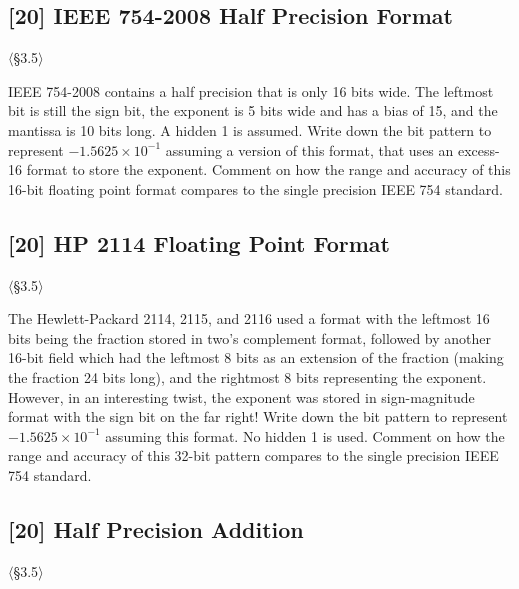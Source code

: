 \problembreak

\subsection{[20] IEEE 754-2008 Half Precision Format}
\hypertarget{prob-3.27}{}
\noindent$\langle$\S3.5$\rangle$\medskip

\noindent IEEE 754-2008 contains a half precision that is only 16 bits wide.
The leftmost bit is still the sign bit, the exponent is 5 bits wide and has a
bias of 15, and the mantissa is 10 bits long. A hidden 1 is assumed. Write
down the bit pattern to represent $-1.5625 \times 10^{-1}$ assuming a version
of this format, that uses an excess-16 format to store the exponent. Comment
on how the range and accuracy of this 16-bit floating point format compares
to the single precision IEEE 754 standard.

\problembreak

\subsection{[20] HP 2114 Floating Point Format}
\hypertarget{prob-3.28}{}
\noindent$\langle$\S3.5$\rangle$\medskip

\noindent The Hewlett-Packard 2114, 2115, and 2116 used a format with the
leftmost 16 bits being the fraction stored in two's complement format,
followed by another 16-bit field which had the leftmost 8 bits as an
extension of the fraction (making the fraction 24 bits long), and the
rightmost 8 bits representing the exponent. However, in an interesting twist,
the exponent was stored in sign-magnitude format with the sign bit on the far
right! Write down the bit pattern to represent $-1.5625 \times 10^{-1}$
assuming this format. No hidden 1 is used. Comment on how the range and
accuracy of this 32-bit pattern compares to the single precision IEEE 754
standard.

\problembreak

\subsection{[20] Half Precision Addition}
\hypertarget{prob-3.29}{}
\noindent$\langle$\S3.5$\rangle$\medskip

